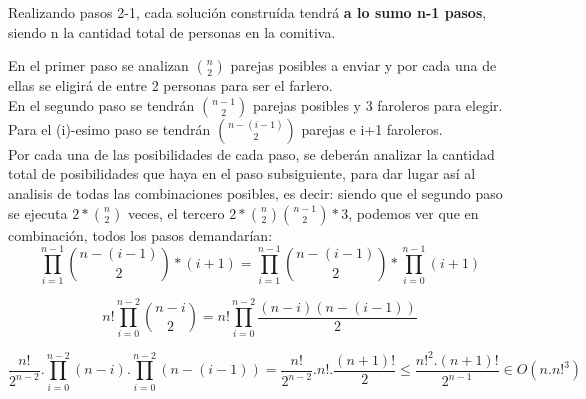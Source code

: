 \vspace*{1em}

Realizando pasos 2-1, cada solución construída tendrá {\bf a lo sumo n-1 pasos}, siendo n la cantidad total de personas en la comitiva.

En el primer paso se analizan $\binom {n}{2}$ parejas posibles a enviar y por cada una de ellas se eligirá de entre 2 personas para ser el farlero.\\

En el segundo paso se tendr\'an $\binom {n-1}{2}$ parejas posibles y 3 faroleros para elegir.\\

Para el (i)-esimo paso se tendrán $\binom {n-(i-1)}{2}$ parejas e i+1 faroleros.\\

Por cada una de las posibilidades de cada paso, se deber\'an analizar la cantidad total de
posibilidades que haya en el paso subsiguiente, para dar lugar as\'i al analisis de todas las combinaciones posibles, es decir: siendo que el segundo paso se ejecuta $2 \ast \binom {n}{2}$ veces, el tercero $2 \ast \binom {n}{2} \binom{n-1} {2} \ast 3$, podemos ver que en combinación, todos los pasos demandarían:
\[
\prod_{i=1}^{n-1}\binom {n-(i-1)}{2}*(i+1) = \prod_{i=1}^{n-1}\binom {n-(i-1)}{2} * \prod_{i=0}^{n-1}(i+1)
\]

\[
n!\prod_{i=0}^{n-2}\binom {n-i}{2} = n!\prod_{i=0}^{n-2}\frac{(n-i)(n-(i-1))}{2}
\]

\[
\frac{ n!}{2^{n-2}}.\prod_{i=0}^{n-2}(n-i).\prod_{i=0}^{n-2}(n-(i-1)) = \frac{n!}{2^{n-2}}.n!.\frac{(n+1)!}{2}\leq \frac{n!^{2}.(n+1)!}{2^{n-1}}\in O(n.n!^{3})
\]
